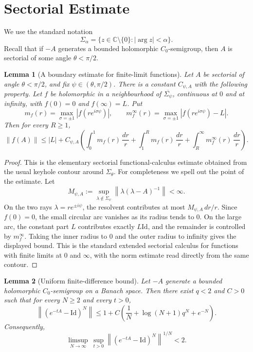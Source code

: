 \documentclass[11pt]{article}
\newtheorem{lemma}{Lemma}
\newcommand{\C}{\mathbb{C}}
\newcommand{\Id}{\mathrm{Id}}
\newcommand{\norm}[1]{\left\lVert #1 \right\rVert}
\newcommand{\abs}[1]{\left\lvert #1 \right\rvert}
\begin{document}
\section*{Sectorial Estimate}

We use the standard notation
\[
  \Sigma_\alpha=\{z\in\C\setminus\{0\}: \abs{\arg z}<\alpha\}.
\]
Recall that if \(-A\) generates a bounded holomorphic \(C_0\)-semigroup, then
\(A\) is sectorial of some angle \(\theta<\pi/2\).

\begin{lemma}[A boundary estimate for finite-limit functions]
\label{lem:sectorial-estimate}
Let \(A\) be sectorial of angle \(\theta<\pi/2\), and fix
\(\psi\in(\theta,\pi/2)\).  There is a constant \(C_{\psi,A}\) with the
following property.  Let \(f\) be holomorphic in a neighbourhood of
\(\overline{\Sigma_\psi}\), continuous at \(0\) and at infinity, with
\(f(0)=0\) and \(f(\infty)=L\).  Put
\[
  m_f(r)=\max_{\sigma=\pm1}\abs{f(re^{i\sigma\psi})},\qquad
  m_f^\infty(r)=\max_{\sigma=\pm1}\abs{f(re^{i\sigma\psi})-L}.
\]
Then for every \(R\geq 1\),
\[
  \norm{f(A)}
  \le
  \abs{L}
  + C_{\psi,A}\left(
      \int_0^1 m_f(r)\,\frac{dr}{r}
      +\int_1^R m_f(r)\,\frac{dr}{r}
      +\int_R^\infty m_f^\infty(r)\,\frac{dr}{r}
    \right).
\]
\end{lemma}

\begin{proof}
This is the elementary sectorial functional-calculus estimate obtained from
the usual keyhole contour around \(\Sigma_\theta\).  For completeness we spell
out the point of the estimate.  Let
\[
  M_{\psi,A}:=\sup_{\lambda\notin\Sigma_\psi}
       \norm{\lambda(\lambda-A)^{-1}}<\infty .
\]
On the two rays \(\lambda=re^{\pm i\psi}\), the resolvent contributes at most
\(M_{\psi,A}\,dr/r\).  Since \(f(0)=0\), the small circular arc vanishes as its
radius tends to \(0\).  On the large arc, the constant part \(L\) contributes
exactly \(L\Id\), and the remainder is controlled by \(m_f^\infty\).  Taking
the inner radius to \(0\) and the outer radius to infinity gives the displayed
bound.  This is the standard extended sectorial calculus for functions with
finite limits at \(0\) and \(\infty\), with the norm estimate read directly
from the same contour.
\end{proof}

\begin{lemma}[Uniform finite-difference bound]
\label{lem:finite-difference-bound}
Let \(-A\) generate a bounded holomorphic \(C_0\)-semigroup on a Banach space.
Then there exist \(q<2\) and \(C>0\) such that for every \(N\geq2\) and every
\(t>0\),
\[
  \norm{(e^{-tA}-\Id)^N}
  \le
  1+C\left(\frac1N+\log(N+1)q^N+e^{-N}\right).
\]
Consequently,
\[
  \limsup_{N\to\infty}\ \sup_{t>0}
  \norm{(e^{-tA}-\Id)^N}^{1/N}<2.
\]
\end{lemma}
\end{document}
